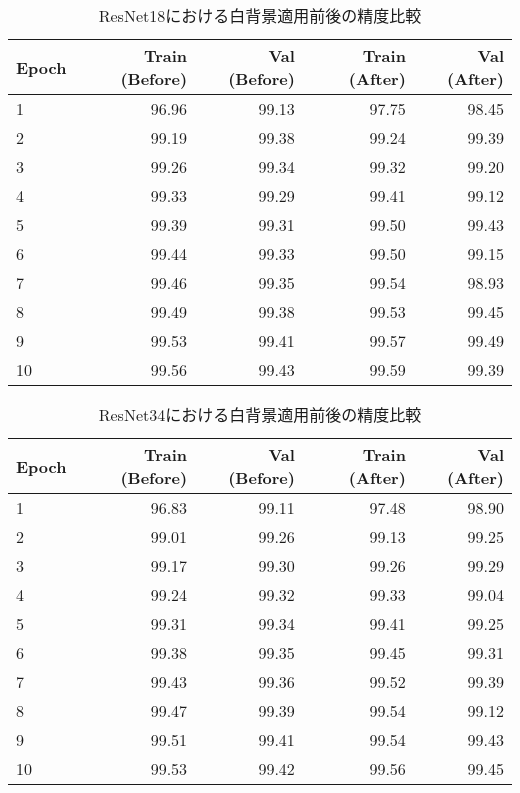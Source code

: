 \documentclass[a4paper,11pt,titlepage]{jsarticle}
\begin{document}
\begin{table}[H]
\centering
\caption{ResNet18における白背景適用前後の精度比較}
\label{tab:Resnet18_compare}
\begin{tabular}{l|rr|rr}
\hline
Epoch & Train (Before) & Val (Before) & Train (After) & Val (After) \\
\hline
1  & 96.96 & 99.13 & 97.75 & 98.45 \\
2  & 99.19 & 99.38 & 99.24 & 99.39 \\
3  & 99.26 & 99.34 & 99.32 & 99.20 \\
4  & 99.33 & 99.29 & 99.41 & 99.12 \\
5  & 99.39 & 99.31 & 99.50 & 99.43 \\
6  & 99.44 & 99.33 & 99.50 & 99.15 \\
7  & 99.46 & 99.35 & 99.54 & 98.93 \\
8  & 99.49 & 99.38 & 99.53 & 99.45 \\
9  & 99.53 & 99.41 & 99.57 & 99.49 \\
10 & 99.56 & 99.43 & 99.59 & 99.39 \\
\hline
\end{tabular}
\end{table}



\begin{table}[H]
\centering
\caption{ResNet34における白背景適用前後の精度比較}
\label{tab:Resnet34_compare}
\begin{tabular}{l|rr|rr}
\hline
Epoch & Train (Before) & Val (Before) & Train (After) & Val (After) \\
\hline
1  & 96.83 & 99.11 & 97.48 & 98.90 \\
2  & 99.01 & 99.26 & 99.13 & 99.25 \\
3  & 99.17 & 99.30 & 99.26 & 99.29 \\
4  & 99.24 & 99.32 & 99.33 & 99.04 \\
5  & 99.31 & 99.34 & 99.41 & 99.25 \\
6  & 99.38 & 99.35 & 99.45 & 99.31 \\
7  & 99.43 & 99.36 & 99.52 & 99.39 \\
8  & 99.47 & 99.39 & 99.54 & 99.12 \\
9  & 99.51 & 99.41 & 99.54 & 99.43 \\
10 & 99.53 & 99.42 & 99.56 & 99.45 \\
\hline
\end{tabular}
\end{table}
\end{document}
